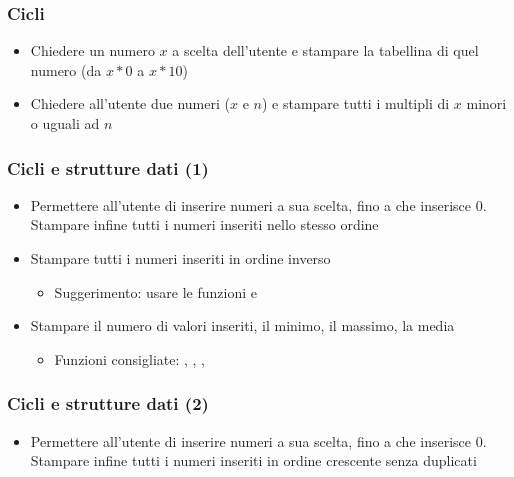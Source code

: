 \begin{exerciseframe}
    \frametitle{Cicli}

    \begin{itemize}
        \item Chiedere un numero $x$ a scelta dell'utente e stampare la tabellina di quel numero (da $x*0$ a $x*10$)

        \pause
        \bigskip
        \item Chiedere all'utente due numeri ($x$ e $n$) e stampare tutti i multipli di $x$ minori o uguali ad $n$
    \end{itemize}
\end{exerciseframe}

\begin{exerciseframe}
    \frametitle{Cicli e strutture dati (1)}

    \begin{itemize}
        \item Permettere all'utente di inserire numeri a sua scelta, fino a che inserisce $0$. Stampare infine tutti i numeri inseriti nello stesso ordine
        
        \pause
        \bigskip
        \item Stampare tutti i numeri inseriti in ordine inverso
        \begin{itemize}
            \item Suggerimento: usare le funzioni  e 
        \end{itemize}

        \pause
        \bigskip
        \item Stampare il numero di valori inseriti, il minimo, il massimo, la media
        \begin{itemize}
            \item Funzioni consigliate: , , , 
        \end{itemize}
    \end{itemize}
\end{exerciseframe}

\begin{exerciseframe}
    \frametitle{Cicli e strutture dati (2)}

    \begin{itemize}
        \item Permettere all'utente di inserire numeri a sua scelta, fino a che inserisce $0$. Stampare infine tutti i numeri inseriti in ordine crescente senza duplicati
    \end{itemize}
\end{exerciseframe}

